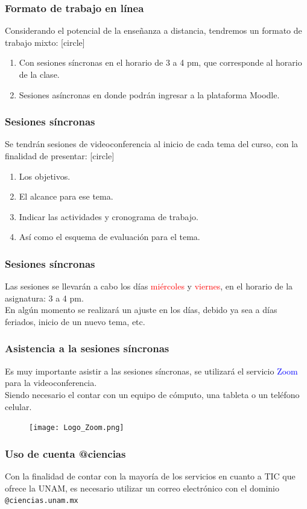 \begin{frame}
\frametitle{Formato de trabajo en línea}
Considerando el potencial de la enseñanza a distancia, tendremos un formato de trabajo mixto:
[circle]
\begin{enumerate}[<+->]
\item Con sesiones síncronas en el horario de 3 a 4 pm, que corresponde al horario de la clase.
\item Sesiones asíncronas en donde podrán ingresar a la plataforma Moodle.
\end{enumerate}
\end{frame}
\begin{frame}
\frametitle{Sesiones síncronas}
Se tendrán sesiones de videoconferencia al inicio de cada tema del curso, con la finalidad de presentar:
[circle]
\begin{enumerate}[<+->]
\item Los objetivos.
\item El alcance para ese tema.
\item Indicar las actividades y cronograma de trabajo.
\item Así como el esquema de evaluación para el tema.
\end{enumerate}
\end{frame}
\begin{frame}
\frametitle{Sesiones síncronas}
Las sesiones se llevarán a cabo los días \textcolor{red}{miércoles} y \textcolor{red}{viernes}, en el horario de la asignatura: 3 a 4 pm.
\\
\bigskip
\pause
En algún momento se realizará un ajuste en los días, debido ya sea a días feriados, inicio de un nuevo tema, etc.
\end{frame}
\begin{frame}
\frametitle{Asistencia a la sesiones síncronas}
Es muy importante asistir a las sesiones síncronas, se utilizará el servicio \textcolor{blue}{Zoom} para la videoconferencia.
\\
\bigskip
\pause
Siendo necesario el contar con un equipo de cómputo, una tableta o un teléfono celular.
\begin{figure}
    \centering
    \texttt{[image: Logo\_Zoom.png]}
\end{figure}
\end{frame}
\begin{frame}
\frametitle{Uso de cuenta @ciencias}
Con la finalidad de contar con la mayoría de los servicios en cuanto a TIC que ofrece la UNAM, es necesario utilizar un correo electrónico con el dominio \texttt{@ciencias.unam.mx}
\end{frame}
